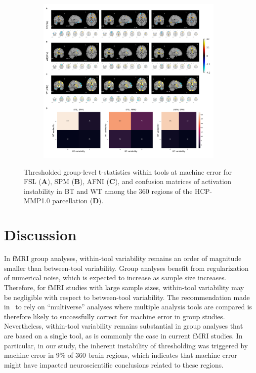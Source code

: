 \documentclass[11pt,onecolumn]{article}
\begin{document}
\begin{figure}[ht]
  \begin{subfigure}[ht]{\textwidth}
    \centering
    \includegraphics[width=\textwidth]{figures/plots/wt-tstats/act_deact-framed.png}
  \end{subfigure}
  \centering
  \caption{Thresholded group-level t-statistics within tools at machine error for FSL (\textbf{A}),
    SPM (\textbf{B}), AFNI (\textbf{C}), and confusion matrices of activation instability
    in BT and WT among the 360 regions of the HCP-MMP1.0 parcellation (\textbf{D}).}
  \label{fig:thresh-maps}
\end{figure}


\section{Discussion}

In fMRI group analyses, within-tool variability remains an order of magnitude smaller
than between-tool variability. Group analyses benefit from regularization
of numerical noise, which is expected to increase as sample size
increases. Therefore, for fMRI studies with large sample sizes, within-tool variability may be negligible with respect to between-tool variability. The
recommendation made in~\cite{botvinik2020variability} to rely on
``multiverse'' analyses where multiple analysis tools are compared is
therefore likely to successfully correct for machine error in group
studies. Nevertheless, within-tool variability remains substantial in group analyses
that are based on a single tool, as is commonly the case in current fMRI
studies. In particular, in our study, the inherent instability of
thresholding was triggered by machine error in 9\% of 360 brain regions,
which indicates that machine error might have impacted neuroscientific
conclusions related to these regions.
\end{document}
